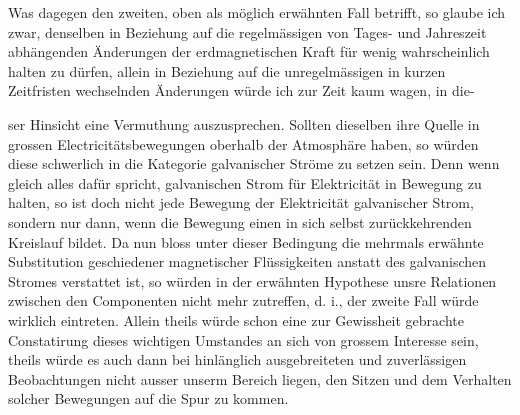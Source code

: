 Was dagegen den zweiten, oben als möglich erwähnten Fall betrifft, so glaube ich zwar, denselben in Beziehung auf die regelmässigen von Tages- und Jahreszeit abhängenden Änderungen der erdmagnetischen Kraft für wenig wahrscheinlich halten zu dürfen, allein in Beziehung auf die unregelmässigen in kurzen Zeitfristen wechselnden Änderungen würde ich zur Zeit kaum wagen, in die-\par\clearpage
{}
\noindent ser Hinsicht eine Vermuthung auszusprechen. Sollten dieselben ihre Quelle in grossen Electricitätsbewegungen oberhalb der Atmosphäre haben, so würden diese schwerlich in die Kategorie galvanischer Ströme zu setzen sein. Denn wenn gleich alles dafür spricht, galvanischen Strom für Elektricität in Bewegung zu halten, so ist doch nicht jede Bewegung der Elektricität galvanischer Strom, sondern nur dann, wenn die Bewegung einen in sich selbst zurückkehrenden Kreislauf bildet. Da nun bloss unter dieser Bedingung die mehrmals erwähnte Substitution geschiedener magnetischer Flüssigkeiten anstatt des galvanischen Stromes verstattet ist, so würden in der erwähnten Hypothese unsre Relationen zwischen den Componenten nicht mehr zutreffen, d. i., der zweite Fall würde wirklich eintreten. Allein theils würde schon eine zur Gewissheit gebrachte Constatirung dieses wichtigen Umstandes an sich von grossem Interesse sein, theils würde es auch dann bei hinlänglich ausgebreiteten und zuverlässigen Beobachtungen nicht ausser unserm Bereich liegen, den Sitzen und dem Verhalten solcher Bewegungen auf die Spur zu kommen.

